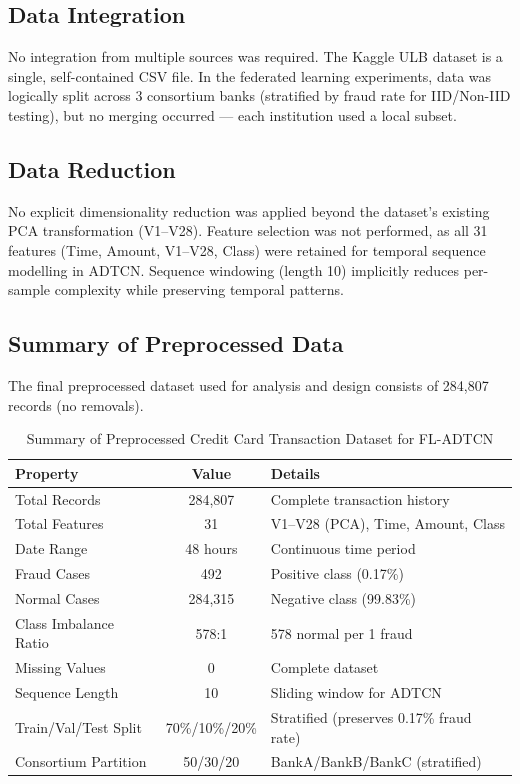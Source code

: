 \subsection{Data Integration}
No integration from multiple sources was required. The Kaggle ULB dataset is a single, self-contained CSV file. In the federated learning experiments, data was logically split across 3 consortium banks (stratified by fraud rate for IID/Non-IID testing), but no merging occurred — each institution used a local subset.

\subsection{Data Reduction}
No explicit dimensionality reduction was applied beyond the dataset's existing PCA transformation (V1–V28). Feature selection was not performed, as all 31 features (Time, Amount, V1–V28, Class) were retained for temporal sequence modelling in ADTCN. Sequence windowing (length 10) implicitly reduces per-sample complexity while preserving temporal patterns.

\subsection{Summary of Preprocessed Data}

The final preprocessed dataset used for analysis and design consists of 284,807 records (no removals).

\begin{table}[h]
\centering
\caption{Summary of Preprocessed Credit Card Transaction Dataset for FL-ADTCN}
\label{tab:dataset_summary}
\begin{tabular}{|l|c|p{7cm}|}
\hline
\textbf{Property} & \textbf{Value} & \textbf{Details} \\
\hline
Total Records & 284,807 & Complete transaction history \\
\hline
Total Features & 31 & V1--V28 (PCA), Time, Amount, Class \\
\hline
Date Range & 48 hours & Continuous time period \\
\hline
Fraud Cases & 492 & Positive class (0.17\%) \\
\hline
Normal Cases & 284,315 & Negative class (99.83\%) \\
\hline
Class Imbalance Ratio & 578:1 & 578 normal per 1 fraud \\
\hline
Missing Values & 0 & Complete dataset \\
\hline
Sequence Length & 10 & Sliding window for ADTCN \\
\hline
Train/Val/Test Split & 70\%/10\%/20\% & Stratified (preserves 0.17\% fraud rate) \\
\hline
Consortium Partition & 50/30/20 & BankA/BankB/BankC (stratified) \\
\hline
\end{tabular}
\end{table}

